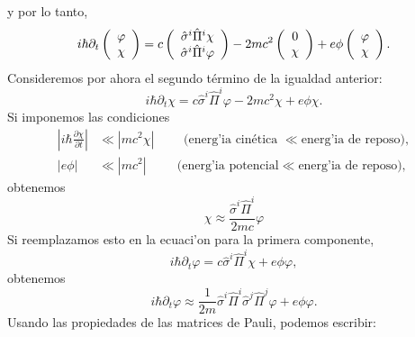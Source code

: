 y por lo tanto,
\begin{equation}
i\hbar\partial_{t}\left(
\begin{array}
[c]{c}%
\varphi\\
\chi
\end{array}
\right) =c\left(
\begin{array}
[c]{c}%
\hat{\sigma}^i\hat{\Pi}^i\chi\\
\hat{\sigma}^i\hat{\Pi}^i\varphi
\end{array}
\right) -2mc^2\left(
\begin{array}
[c]{c}%
0\\
\chi
\end{array}
\right) +e\phi\left(
\begin{array}
[c]{c}%
\varphi\\
\chi
\end{array}
\right).
\end{equation}
Consideremos por ahora el segundo t\'{e}rmino de la igualdad anterior:
\begin{equation}
i\hbar\partial_{t}\chi=c\hat{\sigma}^i\hat{\Pi}^i\varphi-2mc^2%
\chi+e\phi\chi .
\end{equation}
Si imponemos las condiciones
\begin{align}
\left| i\hbar\frac{\partial\chi}{\partial t}\right|  & \ll\left| mc^2\chi\right|
\qquad \text{ (energ'ia cin\'{e}tica }\ll\text{energ'ia de reposo)},\\
\left| e\phi\right|  & \ll\left| mc^2\right| \qquad\ \ 
\text{(energ'ia potencial}\ll\text{energ'ia de reposo)},
\end{align}
obtenemos
\begin{equation}
\chi\approx\frac{\hat{\sigma}^i\hat{\Pi}^i}{2mc}\varphi
\end{equation}
Si reemplazamos esto en la ecuaci'on para la primera componente,
\begin{equation}
i\hbar\partial_{t}\varphi  =c\hat{\sigma}^i\hat{\Pi}^i\chi+e\phi\varphi,
\end{equation} 
obtenemos
\begin{equation}
i\hbar\partial_{t}\varphi  \approx\frac{1}{2m}\hat{\sigma}^i\hat{\Pi}^i%
\hat{\sigma}^{j}\hat{\Pi}^{j}\varphi+e\phi\varphi .
\end{equation} 
Usando las propiedades de las matrices de Pauli, podemos escribir:
